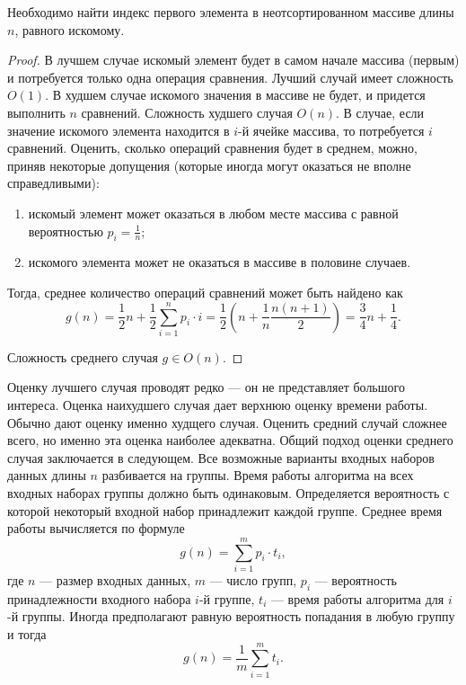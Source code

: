\begin{exampl}
    Необходимо найти индекс первого элемента в неотсортированном массиве длины $n$, равного искомому.
\end{exampl}
\begin{proof}
    В лучшем случае искомый элемент будет в самом начале массива (первым) и потребуется только одна операция сравнения. Лучший случай имеет сложность $O(1)$. В худшем случае искомого значения в массиве не будет, и придется выполнить $n$ сравнений. Сложность худшего случая $O(n)$. В случае, если значение искомого элемента находится в $i$-й ячейке массива, то потребуется $i$ сравнений. Оценить, сколько операций сравнения будет в среднем, можно, приняв некоторые допущения (которые иногда могут оказаться не вполне справедливыми):
    \begin{enumerate}
        \item искомый элемент может оказаться в любом месте массива с равной вероятностью $p_i=\frac{1}{n}$;
        \item искомого элемента может не оказаться в массиве в половине случаев.
    \end{enumerate}

    Тогда, среднее количество операций сравнений может быть найдено как
    \[
        g(n)=\frac{1}{2}n+\frac{1}{2}\sum_{i=1}^{n}p_i\cdot i=\frac{1}{2}\left(n+\frac{1}{n}\frac{n(n+1)}{2}\right)=
        \frac{3}{4}n+\frac{1}{4}.
    \]

    Сложность среднего случая $g\in O(n)$.
\end{proof}

Оценку лучшего случая проводят редко --- он не представляет большого интереса. Оценка наихудшего случая дает верхнюю оценку времени работы. Обычно дают оценку именно худщего случая. Оценить средний случай сложнее всего, но именно эта оценка наиболее адекватна. Общий подход оценки среднего случая заключается в следующем. Все возможные варианты входных наборов данных длины $n$ разбивается на группы. Время работы алгоритма на всех входных наборах группы должно быть одинаковым. Определяется вероятность с которой некоторый входной набор принадлежит каждой группе. Среднее время работы вычисляется по формуле
\[
    g(n)=\sum_{i=1}^{m}p_i\cdot t_i,
\]
где $n$ --- размер входных данных, $m$ --- число групп, $p_i$ --- вероятность принадлежности входного набора $i$-й группе, $t_i$ --- время работы алгоритма для $i$-й группы. Иногда предполагают равную вероятность попадания в любую группу и тогда 
\[
    g(n)=\frac{1}{m}\sum_{i=1}^{m}t_i.
\]

